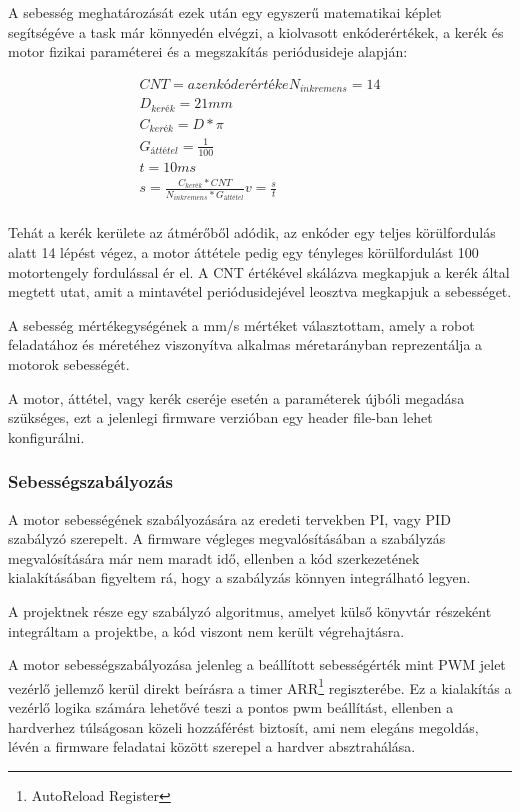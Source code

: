 A sebesség meghatározását ezek után egy egyszerű matematikai képlet segítségéve a
task már könnyedén elvégzi, a kiolvasott enkóderértékek, a kerék és motor fizikai
paraméterei és a megszakítás periódusideje alapján:

\begin{eqnarray*}
CNT = az enkóder értéke
N_{inkremens} = 14 \\
D_{kerék} = 21 mm \\
C_{kerék} = D * \pi \\
G_{áttétel} = \frac{1}{100} \\
t = 10 ms \\
s = \frac{C_{kerék} * CNT}{N_{inkremens} * G_{áttétel}}
v = \frac{s}{t} \\
\end{eqnarray*}

Tehát a kerék kerülete az átmérőből adódik, az enkóder egy teljes körülfordulás
alatt 14 lépést végez, a motor áttétele pedig egy tényleges körülfordulást 100
motortengely fordulással ér el. A CNT értékével skálázva megkapjuk a kerék által
megtett utat, amit a mintavétel periódusidejével leosztva megkapjuk a
sebességet.

A sebesség mértékegységének a mm/s mértéket választottam, amely a robot
feladatához  és méretéhez viszonyítva alkalmas méretarányban reprezentálja a
motorok sebességét.

A motor, áttétel, vagy kerék cseréje esetén a paraméterek újbóli megadása
szükséges, ezt a jelenlegi firmware verzióban egy header file-ban lehet
konfigurálni. 

\subsubsection{Sebességszabályozás}

A motor sebességének szabályozására az eredeti tervekben PI, vagy PID szabályzó
szerepelt. A firmware végleges megvalósításában a szabályzás megvalósítására már
nem maradt idő, ellenben a kód szerkezetének kialakításában figyeltem rá, hogy a
szabályzás könnyen integrálható legyen.

A projektnek része egy szabályzó algoritmus, amelyet külső könyvtár
részeként integráltam a projektbe, a kód viszont nem került
végrehajtásra.


A motor sebességszabályozása jelenleg a beállított sebességérték mint PWM jelet
vezérlő jellemző kerül direkt beírásra a timer ARR\footnote{AutoReload Register}
regiszterébe. Ez a kialakítás a vezérlő logika számára lehetővé teszi a pontos
pwm beállítást, ellenben a hardverhez túlságosan közeli hozzáférést biztosít, ami
nem elegáns megoldás, lévén a firmware feladatai között szerepel a hardver
absztrahálása.

